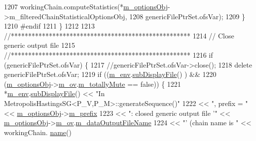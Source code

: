 \begin{DoxyCode}
1207       workingChain.computeStatistics(*\hyperlink{class_q_u_e_s_o_1_1_metropolis_hastings_s_g_a5d0bc9f73d50d272aa6bfb5ef5939ef3}{m\_optionsObj}->m\_filteredChainStatisticalOptionsObj,
1208                                      genericFilePtrSet.ofsVar);
1209     \}
1210 \textcolor{preprocessor}{#endif}
1211 \textcolor{preprocessor}{}  \}
1212 
1213   \textcolor{comment}{//****************************************************}
1214   \textcolor{comment}{// Close generic output file}
1215   \textcolor{comment}{//****************************************************}
1216   \textcolor{keywordflow}{if} (genericFilePtrSet.ofsVar) \{
1217     \textcolor{comment}{//genericFilePtrSet.ofsVar->close();}
1218     \textcolor{keyword}{delete} genericFilePtrSet.ofsVar;
1219     \textcolor{keywordflow}{if} ((\hyperlink{class_q_u_e_s_o_1_1_metropolis_hastings_s_g_ac8ea061e55b920e0c8f9bce5c3f20e52}{m\_env}.\hyperlink{class_q_u_e_s_o_1_1_base_environment_a8a0064746ae8dddfece4229b9ad374d6}{subDisplayFile}()                   ) &&
1220         (\hyperlink{class_q_u_e_s_o_1_1_metropolis_hastings_s_g_a5d0bc9f73d50d272aa6bfb5ef5939ef3}{m\_optionsObj}->\hyperlink{class_q_u_e_s_o_1_1_metropolis_hastings_s_g_options_a9d4792d9fc2dc5439b8ab489b0c236eb}{m\_ov}.\hyperlink{class_q_u_e_s_o_1_1_mh_options_values_af812309e81191e88dfdc87c5815141a3}{m\_totallyMute} == \textcolor{keyword}{false})) \{
1221       *\hyperlink{class_q_u_e_s_o_1_1_metropolis_hastings_s_g_ac8ea061e55b920e0c8f9bce5c3f20e52}{m\_env}.\hyperlink{class_q_u_e_s_o_1_1_base_environment_a8a0064746ae8dddfece4229b9ad374d6}{subDisplayFile}() << \textcolor{stringliteral}{"In MetropolisHastingsSG<P\_V,P\_M>::generateSequence()"}
1222                               << \textcolor{stringliteral}{", prefix = "}                    << 
      \hyperlink{class_q_u_e_s_o_1_1_metropolis_hastings_s_g_a5d0bc9f73d50d272aa6bfb5ef5939ef3}{m\_optionsObj}->\hyperlink{class_q_u_e_s_o_1_1_metropolis_hastings_s_g_options_a4f7c510aaa530336d24259e2a89f5d0b}{m\_prefix}
1223                               << \textcolor{stringliteral}{": closed generic output file '"} << 
      \hyperlink{class_q_u_e_s_o_1_1_metropolis_hastings_s_g_a5d0bc9f73d50d272aa6bfb5ef5939ef3}{m\_optionsObj}->\hyperlink{class_q_u_e_s_o_1_1_metropolis_hastings_s_g_options_a9d4792d9fc2dc5439b8ab489b0c236eb}{m\_ov}.\hyperlink{class_q_u_e_s_o_1_1_mh_options_values_a768664ee23ad3783751eca33eaeb14b9}{m\_dataOutputFileName}
1224                               << \textcolor{stringliteral}{"' (chain name is "}              << workingChain.
      \hyperlink{class_q_u_e_s_o_1_1_base_vector_sequence_a48f6fe02cf77f4233d3bcdfef3870f19}{name}()

\end{DoxyCode}
